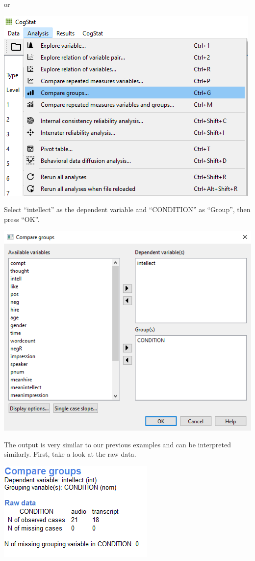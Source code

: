 \documentclass[
]{book}
\begin{document}
or

\includegraphics{img/ch7/7.3comparegroups_menu.png}

Select ``intellect'' as the dependent variable and ``CONDITION'' as ``Group'', then press ``OK''.

\includegraphics{img/ch7/7.3comparegroups_window.png}

The output is very similar to our previous examples and can be interpreted similarly. First, take a look at the raw data.

\includegraphics{img/ch7/7.3comparegroups_raw.png}
\end{document}
